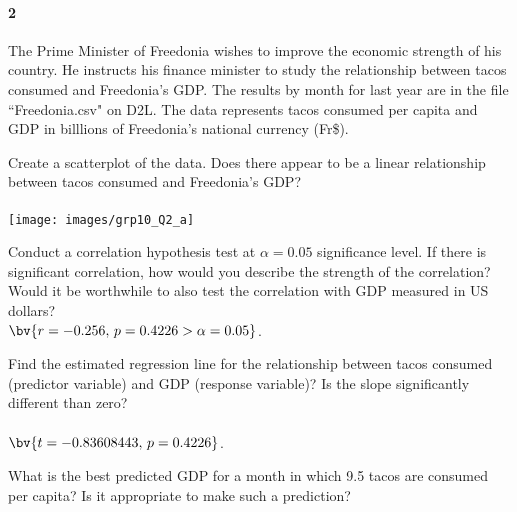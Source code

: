 \documentclass{article}
\begin{document}
\begin{flushleft}
\begin{enumalpha}
\end{enumalpha}



\newpage
\paragraph{2} The Prime Minister of Freedonia wishes to improve the economic strength of his country. He instructs his finance minister to study the relationship between tacos consumed and Freedonia's GDP. The results by month for last year are in the file ``Freedonia.csv" on D2L. The data represents tacos consumed per capita and GDP in billlions of Freedonia's national currency (Fr\$).
\begin{enumalpha}
\item Create a scatterplot of the data. Does there appear to be a linear relationship between tacos consumed and Freedonia's GDP?\\
\medskip
{}\\
\medskip
\texttt{[image: images/grp10\_Q2\_a]}
\vspace{.5in}
\item Conduct a correlation hypothesis test at $\alpha = 0.05$ significance level. If there is significant correlation, how would you describe the strength of the correlation? Would it be worthwhile to also test the correlation with GDP measured in US dollars?\\
\medskip
$\bv{r = -0.256, \, p = 0.4226 > \alpha = 0.05}$. 
\newpage
\item Find the estimated regression line for the relationship between tacos consumed (predictor variable) and GDP (response variable)? Is the slope significantly different than zero?\\
\medskip
{}\\
$\bv{t = -0.83608443, \, p = 0.4226}$. 
\vspace{.5in}
\item What is the best predicted GDP for a month in which 9.5 tacos are consumed per capita? Is it appropriate to make such a prediction?\\
\medskip
{}\\
\\
\medskip
{}
\end{enumalpha}


\end{flushleft}
\end{document}
